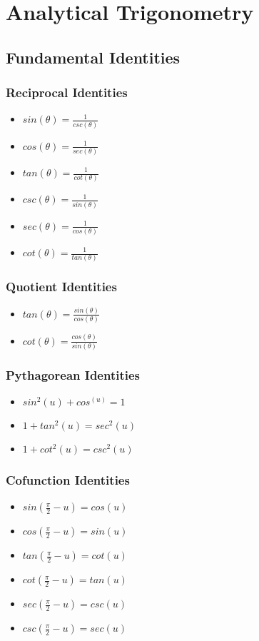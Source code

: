 \chapter{Analytical Trigonometry}
\section{Fundamental Identities}
\subsection{Reciprocal Identities}
\begin{itemize}
  \item{$sin(\theta)=\frac{1}{csc(\theta)}$}
  \item{$cos(\theta)=\frac{1}{sec(\theta)}$}
  \item{$tan(\theta)=\frac{1}{cot(\theta)}$}
  \item{$csc(\theta)=\frac{1}{sin(\theta)}$}
  \item{$sec(\theta)=\frac{1}{cos(\theta)}$}
  \item{$cot(\theta)=\frac{1}{tan(\theta)}$}
\end{itemize}

\subsection{Quotient Identities}
\begin{itemize}
  \item{$tan(\theta)=\frac{sin(\theta)}{cos(\theta)}$}
  \item{$cot(\theta)=\frac{cos(\theta)}{sin(\theta)}$}
\end{itemize}

\subsection{Pythagorean Identities}
\begin{itemize}
  \item{$sin^2(u)+cos^(u)=1$}
  \item{$1+tan^2(u)=sec^2(u)$}
  \item{$1+cot^2(u)=csc^2(u)$}
\end{itemize}

\subsection{Cofunction Identities}
\begin{itemize}
  \item{$sin(\frac{\pi}{2}-u)=cos(u)$}
  \item{$cos(\frac{\pi}{2}-u)=sin(u)$}
  \item{$tan(\frac{\pi}{2}-u)=cot(u)$}
  \item{$cot(\frac{\pi}{2}-u)=tan(u)$}
  \item{$sec(\frac{\pi}{2}-u)=csc(u)$}
  \item{$csc(\frac{\pi}{2}-u)=sec(u)$}
\end{itemize}


